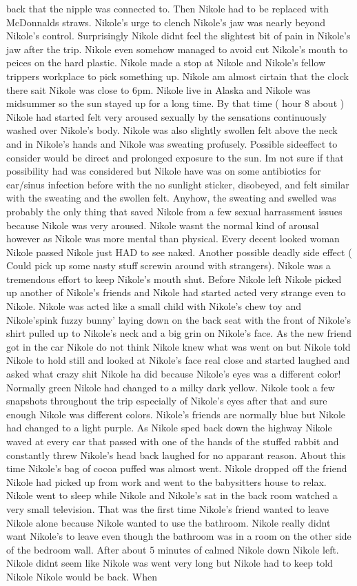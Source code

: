 \documentclass[12pt]{book}
\begin{document}
back that the nipple was connected to. Then Nikole had to be replaced with McDonnalds straws. Nikole's urge to clench Nikole's jaw was nearly beyond Nikole's control. Surprisingly Nikole didnt feel the slightest bit of pain in Nikole's jaw after the trip. Nikole even somehow managed to avoid cut Nikole's mouth to peices on the hard plastic. Nikole made a stop at Nikole and Nikole's fellow trippers workplace to pick something up. Nikole am almost cirtain that the clock there sait Nikole was close to 6pm. Nikole live in Alaska and Nikole was midsummer so the sun stayed up for a long time. By that time ( hour 8 about ) Nikole had started felt very aroused sexually by the sensations continuously washed over Nikole's body. Nikole was also slightly swollen felt above the neck and in Nikole's hands and Nikole was sweating profusely. Possible sideeffect to consider would be direct and prolonged exposure to the sun. Im not sure if that possibility had was considered but Nikole have was on some antibiotics for ear/sinus infection before with the no sunlight sticker, disobeyed, and felt similar with the sweating and the swollen felt. Anyhow, the sweating and swelled was probably the only thing that saved Nikole from a few sexual harrassment issues because Nikole was very aroused. Nikole wasnt the normal kind of arousal however as Nikole was more mental than physical. Every decent looked woman Nikole passed Nikole just HAD to see naked. Another possible deadly side effect ( Could pick up some nasty stuff screwin around with strangers). Nikole was a tremendous effort to keep Nikole's mouth shut. Before Nikole left Nikole picked up another of Nikole's friends and Nikole had started acted very strange even to Nikole. Nikole was acted like a small child with Nikole's chew toy and Nikole'spink fuzzy bunny' laying down on the back seat with the front of Nikole's shirt pulled up to Nikole's neck and a big grin on Nikole's face. As the new friend got in the car Nikole do not think Nikole knew what was went on but Nikole told Nikole to hold still and looked at Nikole's face real close and started laughed and asked what crazy shit Nikole ha did because Nikole's eyes was a different color! Normally green Nikole had changed to a milky dark yellow. Nikole took a few snapshots throughout the trip especially of Nikole's eyes after that and sure enough Nikole was different colors. Nikole's friends are normally blue but Nikole had changed to a light purple. As Nikole sped back down the highway Nikole waved at every car that passed with one of the hands of the stuffed rabbit and constantly threw Nikole's head back laughed for no apparant reason. About this time Nikole's bag of cocoa puffed was almost went. Nikole dropped off the friend Nikole had picked up from work and went to the babysitters house to relax. Nikole went to sleep while Nikole and Nikole's sat in the back room watched a very small television. That was the first time Nikole's friend wanted to leave Nikole alone because Nikole wanted to use the bathroom. Nikole really didnt want Nikole's to leave even though the bathroom was in a room on the other side of the bedroom wall. After about 5 minutes of calmed Nikole down Nikole left. Nikole didnt seem like Nikole was went very long but Nikole had to keep told Nikole Nikole would be back. When 
\end{document}
